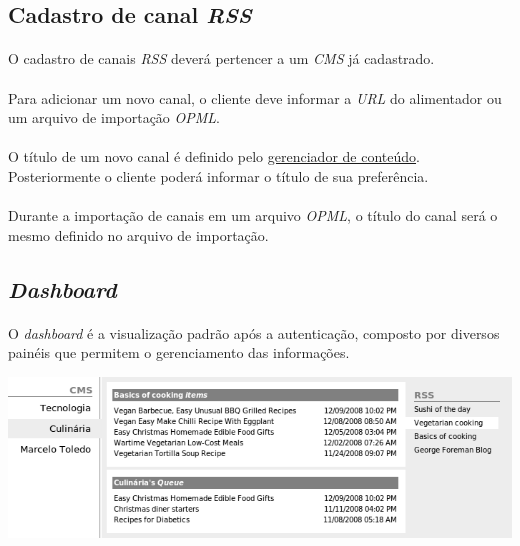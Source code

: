 \documentclass[a4paper,12pt]{article}
\def\blog{\emph{CMS}}
\def\feeds{\emph{RSS}}
\def\url{\emph{URL}}
\def\gerenciadorconteudo{\hyperref[gerenciadorconteudo]{gerenciador de conteúdo}}
\begin{document}
\subsection{Cadastro de canal \feeds{}}

\paragraph{}
O cadastro de canais \feeds{} deverá pertencer a um \blog{} já cadastrado.

\paragraph{}
Para adicionar um novo canal, o cliente deve informar a \url{} do alimentador
ou um arquivo de importação \emph{OPML}.

\paragraph{}
O título de um novo canal é definido pelo \gerenciadorconteudo{}.
Posteriormente o cliente poderá informar o título de sua preferência.

\paragraph{}
Durante a importação de canais em um arquivo \emph{OPML}, o título do canal
será o mesmo definido no arquivo de importação.

\subsection{\emph{Dashboard}}

\paragraph{}
O \emph{dashboard} é a visualização padrão após a autenticação, composto por
diversos painéis que permitem o gerenciamento das informações. 

\begin{center}
\includegraphics[scale=0.5]{dashboard.png}
\end{center}
\end{document}

